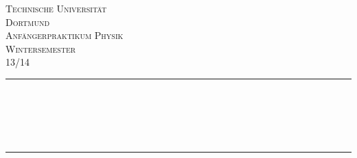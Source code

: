 \begin{titlepage}

\begin{center}

\vspace*{2cm}

\textsc{\LARGE Technische Universität\\ Dortmund}\\[1.5cm]

\textsc{\Large Anfängerpraktikum Physik\\ Wintersemester \\ 13/14}\\[0.5cm]


\newcommand{\HRule}{\rule{\linewidth}{0.5mm}}
\HRule \\[0.4cm]
{ \huge \bfseries \VNr }\\[0.4cm]
{ \huge \bfseries \VN }\\[0.4cm]
{\large \VD}\\

\HRule \\[1.5cm]

\begin{minipage}{0.4\textwidth}
\begin{flushleft} \large
\Namen
\end{flushleft}
\end{minipage}
\hfill
\begin{minipage}{0.4\textwidth}
\begin{flushright} \large
\Emails
\end{flushright}
\end{minipage}

\vfill



\end{center}

\end{titlepage}